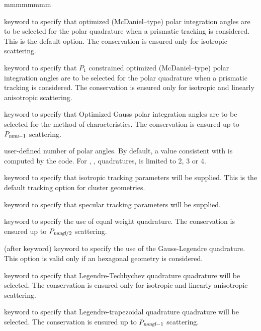\begin{ListeDeDescription}{mmmmmmmm}
\item[\moc{LCMD}] keyword to specify that optimized (McDaniel--type) polar integration angles are to be
selected for the polar quadrature when a prismatic tracking is considered.\cite{LCMD} This is the default option. The conservation is ensured only for isotropic scattering.

\item[\moc{OPP1}] keyword to specify that $P_1$ constrained optimized (McDaniel--type) polar integration angles are to be selected for the polar quadrature when a prismatic tracking is considered.\cite{LeTellierpa} The conservation is ensured only for isotropic and linearly anisotropic scattering.

\item[\moc{OGAU}] keyword to specify that Optimized Gauss polar integration angles are to be
selected for the method of characteristics.\cite{LCMD,LeTellierpa} The conservation is ensured up to $P_{\dusa{nmu}-1}$ scattering.

\item[\dusa{nmu}]  user-defined number of polar angles. By default, a value consistent with  is computed by the code. For , ,  quadratures,  is limited to 2, 3 or 4.

\item[\moc{TISO}] keyword to specify that isotropic tracking parameters will be supplied. This is the
default tracking option for cluster geometries. 

\item[\moc{TSPC}] keyword to specify that specular tracking parameters will be supplied.

\item[\moc{EQW}] keyword to specify the use of equal weight quadrature.\cite{eqn} The conservation is ensured up to $P_{\dusa{nangl}/2}$ scattering.

\item[\moc{GAUS}] (after  keyword) keyword to specify the use of the Gauss-Legendre quadrature. This option is valid only if an 
hexagonal geometry is considered.

\item[\moc{PNTN}] keyword to specify that Legendre-Techbychev quadrature quadrature will be selected.\cite{pntn} The conservation is ensured only for isotropic and linearly anisotropic scattering.

\item[\moc{SMS}] keyword to specify that Legendre-trapezoidal quadrature quadrature will be selected.\cite{sms} The conservation is ensured up to $P_{\dusa{nangl}-1}$ scattering.


\end{ListeDeDescription}
